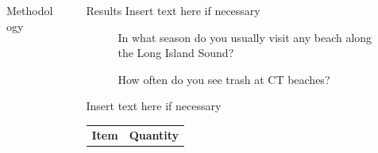 \documentclass[final]{beamer}
\newlength{\sepwidth}
\newlength{\colwidth}
\newcommand{\separatorcolumn}{\begin{column}{\sepwidth}\end{column}}
\begin{document}
\begin{frame}[t]
\begin{columns}[t]
\begin{column}{\colwidth}
\begin{block}{Methodology}
        \end{block}
      \end{column}

      \separatorcolumn

      \begin{column}{\colwidth}

        \begin{block}{Results}
            Insert text here if necessary
            \begin{figure}[h!]
                \centering
                \begin{minipage}[t]{0.45\textwidth}
                    \centering
                    \caption{\centering In what season do you usually visit any beach along the Long Island Sound?}
                \end{minipage}%
                \hfill
                \begin{minipage}[t]{0.45\textwidth}
                    \centering
                    \caption{\centering How often do you see trash at CT beaches?}
                \end{minipage}
            \end{figure}
        Insert text here if necessary
          \begin{table}
            \centering
            \begin{tabular}{l r }
              \toprule
              \textbf{Item} & \textbf{Quantity} \\

\end{tabular}
\end{table}
\end{block}
\end{column}
\end{columns}
\end{frame}
\end{document}
